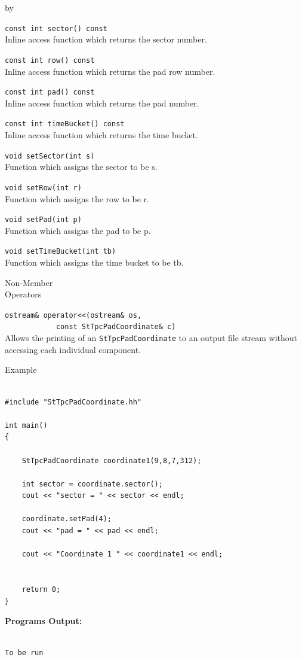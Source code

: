 \documentclass[twoside]{article}
\newcommand{\comp}[1]{\texttt{#1}}%
\newcommand{\entrylabel}[1]{\mbox{\textbf{{#1}}}\hfil}%
\newenvironment{entry}
{\begin{list}{}%
    {\renewcommand{\makelabel}{\entrylabel}%
     \setlength{\labelwidth}{90pt}%
     \setlength{\leftmargin}{\labelwidth}
     \advance\leftmargin by \labelsep%
      }%
    }%
  {\end{list}}
\newcommand{\Entrylabel}[1]%
{\raisebox{0pt}[1ex][0pt]{\makebox[\labelwidth][l]%
    {\parbox[t]{\labelwidth}{\hspace{0pt}\textbf{{#1}}}}}}
\newenvironment{Entry}%
{\renewcommand{\entrylabel}{\Entrylabel}\begin{entry}}%
  {\end{entry}}
\begin{document}
\begin{Entry}
  \verb+const int sector() const+\\
  Inline access function which returns the sector number.

  \verb+const int row() const+\\
  Inline access function which returns the pad row number.

  \verb+const int pad() const+\\
  Inline access function which returns the pad number.

  \verb+const int timeBucket() const+\\
  Inline access function which returns the time bucket.

  \verb+void setSector(int s) +\\
  Function which assigns the sector to be s.

  \verb+void setRow(int r) +\\
  Function which assigns the row to be r.

  \verb+void setPad(int p) +\\
  Function which assigns the pad to be p.

  \verb+void setTimeBucket(int tb) +\\
  Function which assigns the time bucket to be tb.

\item[Non-Member \\ Operators]

  \verb+ostream& operator<<(ostream& os,+\\
  \verb+            const StTpcPadCoordinate& c)+\\
  Allows the printing of an \comp{StTpcPadCoordinate} to an output file stream
  without accessing each individual component.

\item[Example]

{\footnotesize
\begin{verbatim}

#include "StTpcPadCoordinate.hh"

int main()
{

    StTpcPadCoordinate coordinate1(9,8,7,312);

    int sector = coordinate.sector();
    cout << "sector = " << sector << endl;

    coordinate.setPad(4);
    cout << "pad = " << pad << endl;

    cout << "Coordinate 1 " << coordinate1 << endl;


    return 0;
}
\end{verbatim}
}%
{\bf Programs Output:}
{\footnotesize
\begin{verbatim}

To be run

\end{verbatim}
} %

\end{Entry}
\clearpage
\end{document}
